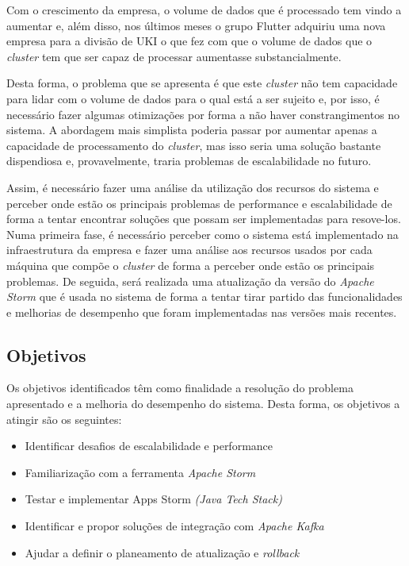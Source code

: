 Com o crescimento da empresa, o volume de dados que é processado tem vindo a aumentar e, além disso,
nos últimos meses o grupo Flutter adquiriu uma nova empresa para a divisão de \ac{UKI} o que fez 
com que o volume de dados que o \textit{\gls{cluster}} tem que ser capaz de processar aumentasse 
substancialmente.

Desta forma, o problema que se apresenta é que este \textit{\gls{cluster}} não tem capacidade para lidar
com o volume de dados para o qual está a ser sujeito e, por isso, é necessário fazer algumas
otimizações por forma a não haver constrangimentos no sistema. A abordagem mais simplista poderia 
passar por aumentar apenas a capacidade de processamento do \textit{\gls{cluster}}, mas isso seria uma 
solução bastante dispendiosa e, provavelmente, traria problemas de escalabilidade no futuro.

Assim, é necessário fazer uma análise da utilização dos recursos do sistema e perceber onde estão 
os principais problemas de performance e escalabilidade de forma a tentar encontrar soluções que 
possam ser implementadas para resove-los. Numa primeira fase, é necessário perceber como o sistema 
está implementado na infraestrutura da empresa e fazer uma análise aos recursos usados por cada 
máquina que compõe o \textit{\gls{cluster}} de forma a perceber onde estão os principais problemas. De 
seguida, será realizada uma atualização da versão do \textit{Apache Storm} que é usada no sistema 
de forma a tentar tirar partido das funcionalidades e melhorias de desempenho que foram 
implementadas nas versões mais recentes.

\subsection{Objetivos}

Os objetivos identificados têm como finalidade a resolução do problema apresentado e a melhoria do
desempenho do sistema. Desta forma, os objetivos a atingir são os seguintes:

\begin{itemize}
  \item Identificar desafios de escalabilidade e performance
  \item Familiarização com a ferramenta \textit{Apache Storm }
  \item Testar e implementar Apps Storm \textit{(Java Tech Stack)}
  \item Identificar e propor soluções de integração com \textit{Apache Kafka}
  \item Ajudar a definir o planeamento de atualização e \textit{rollback}
\end{itemize}

